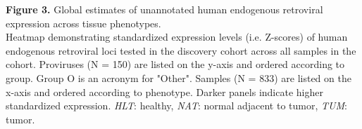 \textbf{Figure 3.} Global estimates of unannotated human endogenous retroviral expression across tissue phenotypes. \\
Heatmap demonstrating standardized expression levels (i.e. Z-scores) of human endogenous retroviral loci tested in the discovery cohort across all samples in the cohort.
Proviruses (N = 150) are listed on the y-axis and ordered according to group.
Group O is an acronym for "Other".
Samples (N = 833) are listed on the x-axis and ordered according to phenotype.
Darker panels indicate higher standardized expression.
\emph{HLT}: healthy, \emph{NAT}: normal adjacent to tumor, \emph{TUM}: tumor.
